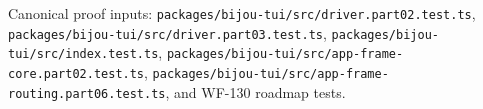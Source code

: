 \begin{itemize}
  Canonical proof inputs: \texttt{p\allowbreak{}a\allowbreak{}c\allowbreak{}k\allowbreak{}a\allowbreak{}g\allowbreak{}e\allowbreak{}s\allowbreak{}/\allowbreak{}b\allowbreak{}i\allowbreak{}j\allowbreak{}o\allowbreak{}u\allowbreak{}-\allowbreak{}t\allowbreak{}u\allowbreak{}i\allowbreak{}/\allowbreak{}s\allowbreak{}r\allowbreak{}c\allowbreak{}/\allowbreak{}d\allowbreak{}r\allowbreak{}i\allowbreak{}v\allowbreak{}e\allowbreak{}r\allowbreak{}.\allowbreak{}p\allowbreak{}a\allowbreak{}r\allowbreak{}t\allowbreak{}0\allowbreak{}2\allowbreak{}.\allowbreak{}t\allowbreak{}e\allowbreak{}s\allowbreak{}t\allowbreak{}.\allowbreak{}t\allowbreak{}s}, \texttt{p\allowbreak{}a\allowbreak{}c\allowbreak{}k\allowbreak{}a\allowbreak{}g\allowbreak{}e\allowbreak{}s\allowbreak{}/\allowbreak{}b\allowbreak{}i\allowbreak{}j\allowbreak{}o\allowbreak{}u\allowbreak{}-\allowbreak{}t\allowbreak{}u\allowbreak{}i\allowbreak{}/\allowbreak{}s\allowbreak{}r\allowbreak{}c\allowbreak{}/\allowbreak{}d\allowbreak{}r\allowbreak{}i\allowbreak{}v\allowbreak{}e\allowbreak{}r\allowbreak{}.\allowbreak{}p\allowbreak{}a\allowbreak{}r\allowbreak{}t\allowbreak{}0\allowbreak{}3\allowbreak{}.\allowbreak{}t\allowbreak{}e\allowbreak{}s\allowbreak{}t\allowbreak{}.\allowbreak{}t\allowbreak{}s}, \texttt{p\allowbreak{}a\allowbreak{}c\allowbreak{}k\allowbreak{}a\allowbreak{}g\allowbreak{}e\allowbreak{}s\allowbreak{}/\allowbreak{}b\allowbreak{}i\allowbreak{}j\allowbreak{}o\allowbreak{}u\allowbreak{}-\allowbreak{}t\allowbreak{}u\allowbreak{}i\allowbreak{}/\allowbreak{}s\allowbreak{}r\allowbreak{}c\allowbreak{}/\allowbreak{}i\allowbreak{}n\allowbreak{}d\allowbreak{}e\allowbreak{}x\allowbreak{}.\allowbreak{}t\allowbreak{}e\allowbreak{}s\allowbreak{}t\allowbreak{}.\allowbreak{}t\allowbreak{}s}, \texttt{p\allowbreak{}a\allowbreak{}c\allowbreak{}k\allowbreak{}a\allowbreak{}g\allowbreak{}e\allowbreak{}s\allowbreak{}/\allowbreak{}b\allowbreak{}i\allowbreak{}j\allowbreak{}o\allowbreak{}u\allowbreak{}-\allowbreak{}t\allowbreak{}u\allowbreak{}i\allowbreak{}/\allowbreak{}s\allowbreak{}r\allowbreak{}c\allowbreak{}/\allowbreak{}a\allowbreak{}p\allowbreak{}p\allowbreak{}-\allowbreak{}f\allowbreak{}r\allowbreak{}a\allowbreak{}m\allowbreak{}e\allowbreak{}-\allowbreak{}c\allowbreak{}o\allowbreak{}r\allowbreak{}e\allowbreak{}.\allowbreak{}p\allowbreak{}a\allowbreak{}r\allowbreak{}t\allowbreak{}0\allowbreak{}2\allowbreak{}.\allowbreak{}t\allowbreak{}e\allowbreak{}s\allowbreak{}t\allowbreak{}.\allowbreak{}t\allowbreak{}s}, \texttt{p\allowbreak{}a\allowbreak{}c\allowbreak{}k\allowbreak{}a\allowbreak{}g\allowbreak{}e\allowbreak{}s\allowbreak{}/\allowbreak{}b\allowbreak{}i\allowbreak{}j\allowbreak{}o\allowbreak{}u\allowbreak{}-\allowbreak{}t\allowbreak{}u\allowbreak{}i\allowbreak{}/\allowbreak{}s\allowbreak{}r\allowbreak{}c\allowbreak{}/\allowbreak{}a\allowbreak{}p\allowbreak{}p\allowbreak{}-\allowbreak{}f\allowbreak{}r\allowbreak{}a\allowbreak{}m\allowbreak{}e\allowbreak{}-\allowbreak{}r\allowbreak{}o\allowbreak{}u\allowbreak{}t\allowbreak{}i\allowbreak{}n\allowbreak{}g\allowbreak{}.\allowbreak{}p\allowbreak{}a\allowbreak{}r\allowbreak{}t\allowbreak{}0\allowbreak{}6\allowbreak{}.\allowbreak{}t\allowbreak{}e\allowbreak{}s\allowbreak{}t\allowbreak{}.\allowbreak{}t\allowbreak{}s}, and WF-130 roadmap tests.

\end{itemize}
